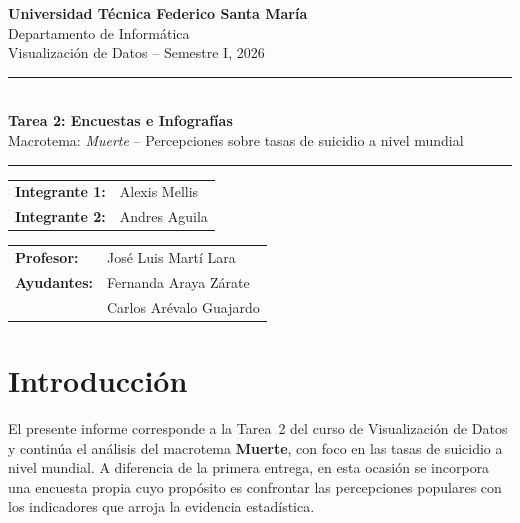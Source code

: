 \documentclass[12pt, letterpaper]{article}
\begin{document}
\begin{titlepage}
  \centering
  \vspace*{1.5cm}

  {\Large\bfseries Universidad Técnica Federico Santa María}\\[0.3cm]
  {\large Departamento de Informática}\\[0.2cm]
  {\large Visualización de Datos -- Semestre I, 2026}

  \vspace{1.5cm}
  \rule{\linewidth}{0.5pt}\\[0.4cm]
  {\LARGE\bfseries Tarea 2: Encuestas e Infografías}\\[0.2cm]
  {\large Macrotema: \textit{Muerte} -- Percepciones sobre tasas de suicidio a nivel mundial}
  \rule{\linewidth}{0.5pt}

  \vspace{1.5cm}

  \begin{tabular}{ll}
    \textbf{Integrante 1:} & Alexis Mellis \\[0.2cm]
    \textbf{Integrante 2:} & Andres Aguila \\
  \end{tabular}

  \vspace{1cm}

  \begin{tabular}{ll}
    \textbf{Profesor:}  & José Luis Martí Lara \\[0.3cm]
    \textbf{Ayudantes:}   & Fernanda Araya Zárate \\
                          & Carlos Arévalo Guajardo \\
  \end{tabular}

  \vfill

\end{titlepage}

\tableofcontents
\newpage

\section{Introducción}

El presente informe corresponde a la Tarea~2 del curso de Visualización de Datos y continúa el análisis del macrotema \textbf{Muerte}, con foco en las tasas de suicidio a nivel mundial. A diferencia de la primera entrega, en esta ocasión se incorpora una encuesta propia cuyo propósito es confrontar las percepciones populares con los indicadores que arroja la evidencia estadística.
\end{document}
